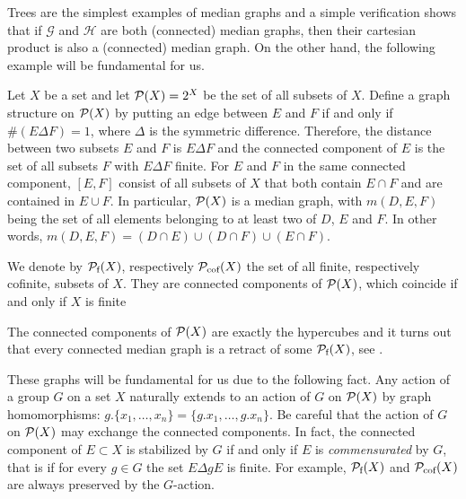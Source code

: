Trees are the simplest examples of median graphs and a simple verification shows that if $\mathcal G$ and $\mathcal H$ are both (connected) median graphs, then their cartesian product is also a (connected) median graph.
On the other hand, the following example will be fundamental for us.
%
%
\begin{exmp}\label{Ex:MainMedian}
Let $X$ be a set and let  $\mathcal P(X)=2^X$ be the set of all subsets of $X$.
Define a graph structure on $\mathcal P(X)$ by putting an edge between $E$ and $F$ if and only if $\#(E\Delta F)=1$, where $\Delta$ is the symmetric difference.
Therefore, the distance between two subsets $E$ and $F$ is $E\Delta F$ and
the connected component of $E$ is the set of all subsets $F$ with $E\Delta F$ finite.
For $E$ and $F$ in the same connected component, $[E,F]$ consist of all subsets of $X$ that both contain $E\cap F$ and are contained in $E\cup F$.
In particular, $\mathcal P(X)$ is a median graph, with $m(D,E,F)$ being the set of all elements belonging to at least two of $D$, $E$ and $F$. In other words, $m(D,E,F)=(D\cap E)\cup(D\cap F)\cup(E\cap F)$.
\end{exmp}
%
%
We denote by $\mathcal P_{\textnormal{f}}(X)$, respectively $\mathcal P_{\textnormal{cof}}(X)$ the set of all finite, respectively cofinite, subsets of $X$.
They are connected components of $\mathcal P(X)$, which coincide if and only if $X$ is finite

The connected components of $\mathcal P(X)$ are exactly the hypercubes and it turns out that every connected median graph is a retract of some $\mathcal P_{\textnormal{f}}(X)$, see \cite{Bandelt1984}.

These graphs will be fundamental for us due to the following fact.
Any action of a group $G$ on a set $X$ naturally extends to an action of $G$ on $\mathcal P(X)$ by graph homomorphisms: $g.\{x_1,\dots,x_n\}=\{g.x_1,\dots,g.x_n\}$.
Be careful that the action of $G$ on $\mathcal P(X)$ may exchange the connected components.
In fact, the connected component of $E\subset X$ is stabilized by $G$ if and only if $E$ is \emph{commensurated} by $G$, that is if for every $g\in G$ the set $E\Delta gE$ is finite.
For example, $\mathcal P_{\textnormal{f}}(X)$ and $\mathcal P_{\textnormal{cof}}(X)$ are always preserved by the $G$-action.


